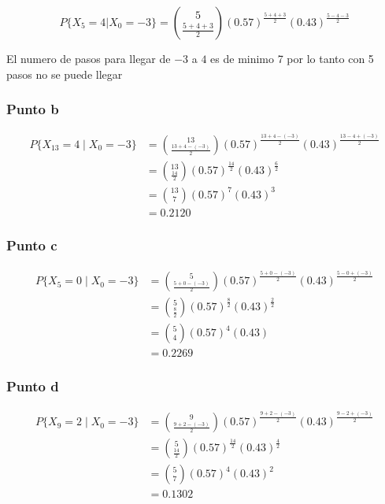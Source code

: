 \documentclass{article}
\begin{document}
\[
    P\{X_{5} = 4 | X_0 = -3\} = \binom{5}{\frac{5+4+3}{2}} \left(0.57\right)^{\frac{5+4+3}{2}} \left(0.43\right)^{\frac{5-4-3}{2}}
\]

El numero de pasos para llegar de \(-3\) a \(4\) es de minimo 7 por lo tanto con 5 pasos no se puede llegar

\subsubsection*{Punto b}

\begin{align*}
    P\{X_{13} = 4 \mid X_0 = -3\} & = \binom{13}{\frac{13+4-(-3)}{2}} \left(0.57\right)^{\frac{13 + 4 - (-3)}{2}} \left(0.43\right)^{\frac{13 - 4 + (-3)}{2}} \\
                                  & = \binom{13}{\frac{14}{2}} \left(0.57\right)^{\frac{14}{2}} \left(0.43\right)^{\frac{6}{2}}                               \\
                                  & = \binom{13}{7} \left(0.57\right)^{7} \left(0.43\right)^{3}                                                               \\
                                  & = 0.2120
\end{align*}

\subsubsection*{Punto c}

\begin{align*}
    P\{X_{5} = 0 \mid X_0 = -3\} & = \binom{5}{\frac{5 + 0-(-3)}{2}} \left(0.57\right)^{\frac{5 + 0 - (-3)}{2}} \left(0.43\right)^{\frac{5 - 0 + (-3)}{2}} \\
                                 & = \binom{5}{\frac{8}{2}} \left(0.57\right)^{\frac{8}{2}} \left(0.43\right)^{\frac{2}{2}}                                \\
                                 & = \binom{5}{4} \left(0.57\right)^{4} \left(0.43\right)                                                                  \\
                                 & = 0.2269
\end{align*}

\subsubsection*{Punto d}

\begin{align*}
    P\{X_{9} = 2 \mid X_0 = -3\} & = \binom{9}{\frac{9 + 2 -(-3)}{2}} \left(0.57\right)^{\frac{9 + 2 - (-3)}{2}} \left(0.43\right)^{\frac{9 - 2 + (-3)}{2}} \\
                                 & = \binom{5}{\frac{14}{2}} \left(0.57\right)^{\frac{14}{2}} \left(0.43\right)^{\frac{4}{2}}                               \\
                                 & = \binom{5}{7} \left(0.57\right)^{4} \left(0.43\right)^{2}                                                               \\
                                 & = 0.1302
\end{align*}
\end{document}
